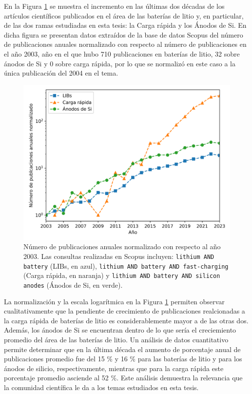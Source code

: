 En la Figura \ref{fig:scopus} se muestra el incremento en las últimas dos décadas
de los artículos científicos publicados en el área de las baterías de litio y, en 
particular, de las dos ramas estudiadas en esta tesis: la Carga rápida y los 
Ánodos de Si. En dicha figura se presentan datos extraídos de la base de datos 
Scopus \cite{SCOPUS} del número de publicaciones anuales normalizado con respecto 
al número de publicaciones en el año 2003, año en el que hubo 710 publicaciones 
en baterías de litio, 32 sobre ánodos de Si y 0 sobre carga rápida, por lo que 
se normalizó en este caso a la única publicación del 2004 en el tema.
\begin{figure}[h!]
    \centering
    \includegraphics[width=.8\textwidth]{Introduccion/baterias/scopus.png}
    \caption{Número de publicaciones anuales normalizado con respecto al año 2003. 
    Las consultas realizadas en Scopus \cite{SCOPUS} incluyen: 
    \texttt{lithium AND battery} (LIBs, en azul), \texttt{lithium AND battery AND 
    fast-charging} (Carga rápida, en naranja) y \texttt{lithium AND battery AND 
    silicon anodes} (Ánodos de Si, en verde).}
    \label{fig:scopus}
\end{figure}
La normalización y la escala logarítmica en la Figura \ref{fig:scopus} permiten
observar cualitativamente que la pendiente de crecimiento de publicaciones 
realcionadas a la carga rápida de baterías de litio es considerablemente mayor a 
de las otras dos. Además, los ánodos de Si se encuentran dentro de lo que sería
el creciemiento promedio del área de las baterías de litio. Un análisis de datos
cuantitativo permite determinar que en la última década el aumento de porcentaje
anual de publicaciones promedio fue del 15 \% y 16 \% para las baterías de litio 
y para los ánodos de silicio, respectivamente, mientras que para la carga rápida 
este porcentaje promedio asciende al 52 \%. Este análisis demuestra la relevancia
que la comunidad científica le da a los temas estudiados en esta tesis.
